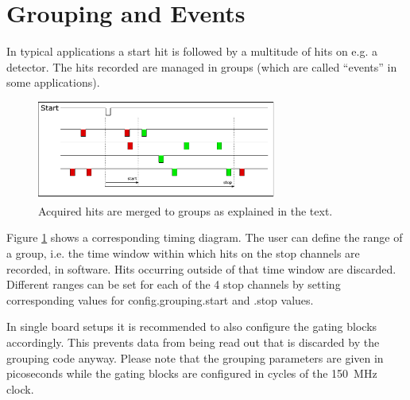 \section{Grouping and Events}
\label{grouping}

In typical applications a start hit is followed by a multitude of hits on e.g. a detector. 
The hits recorded are managed in groups (which are called ``events'' in some applications). 
%
\begin{figure}[ht]
    \begin{center}
        \includegraphics[width=0.7\textwidth]{figures/grouping.pdf}
        \caption{Acquired hits are merged to groups as explained in the text.\label{fig:grouping}}
    \end{center}
\end{figure}
%

Figure \ref{fig:grouping} shows a corresponding timing diagram. The user can define the range of a group, i.e. the time window within which hits 
on the stop channels are recorded, in software. Hits occurring outside of that time window are discarded. 
 Different ranges can be set for each of the 4 stop channels by setting corresponding values for \textsf{config.grouping.start} and \textsf{.stop} values.


 In single board setups it is recommended to also configure the gating blocks accordingly. 
 This prevents data from being read out that is discarded by the grouping code anyway. 
 Please note that the grouping parameters are given in picoseconds while the gating blocks are configured in cycles of the 150~MHz clock.
